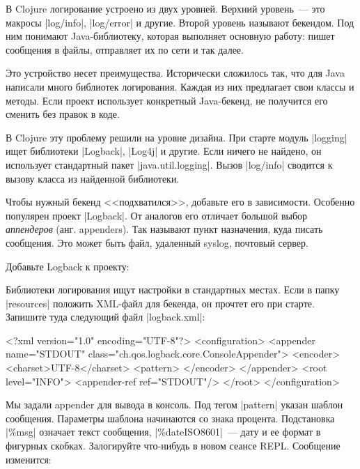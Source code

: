 В Clojure логирование устроено из двух уровней. Верхний уровень~--- это макросы
\spverb|log/info|, \spverb|log/error| и другие. Второй уровень называют
бекендом. Под ним понимают Java-библиотеку, которая выполняет основную работу:
пишет сообщения в файлы, отправляет их по сети и так далее.

Это устройство несет преимущества. Исторически сложилось так, что для Java
написали много библиотек логирования. Каждая из них предлагает свои классы и
методы. Если проект использует конкретный Java-бекенд, не получится его сменить
без правок в коде.

В Clojure эту проблему решили на уровне дизайна. При старте модуль
\spverb|logging| ищет библиотеки \spverb|Logback|, \spverb|Log4j| и другие. Если
ничего не найдено, он использует стандартный пакет
\spverb|java.util.logging|. Вызов \spverb|log/info| сводится к вызову класса из
найденной библиотеки.

Чтобы нужный бекенд <<подхватился>>, добавьте его в зависимости. Особенно
популярен проект \spverb|Logback|. От аналогов его отличает большой выбор
\emph{аппендеров} (анг. appenders). Так называют пункт назначения, куда писать
сообщения. Это может быть файл, удаленный syslog, почтовый сервер.

Добавьте Logback к проекту:

\begin{english}
  \begin{clojure}
  \end{clojure}
\end{english}

Библиотеки логирования ищут настройки в стандартных местах. Если в папку
\spverb|resources| положить XML-файл для бекенда, он прочтет его при
старте. Запишите туда следующий файл \spverb|logback.xml|:

\begin{english}
  \begin{xml}
<?xml version="1.0" encoding="UTF-8"?>
<configuration>
  <appender name="STDOUT" class="ch.qos.logback.core.ConsoleAppender">
    <encoder>
      <charset>UTF-8</charset>
      <pattern>%
    </encoder>
  </appender>
  <root level="INFO">
    <appender-ref ref="STDOUT"/>
  </root>
</configuration>
  \end{xml}
\end{english}

Мы задали appender для вывода в консоль. Под тегом \spverb|pattern| указан
шаблон сообщения. Параметры шаблона начинаются со знака процента. Подстановка
\spverb|\%msg| означает текст сообщения, \spverb|\%date{ISO8601}|~--- дату и ее
формат в фигурных скобках. Залогируйте что-нибудь в новом сеансе REPL. Сообщение
изменится:

